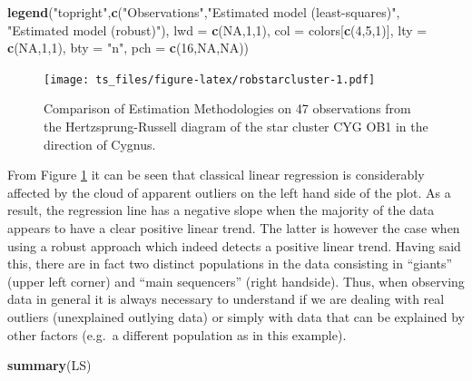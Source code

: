 \documentclass[]{book}
\newenvironment{Shaded}{\begin{snugshade}}{\end{snugshade}}
\newcommand{\DataTypeTok}[1]{\textcolor[rgb]{0.13,0.29,0.53}{#1}}
\newcommand{\DecValTok}[1]{\textcolor[rgb]{0.00,0.00,0.81}{#1}}
\newcommand{\KeywordTok}[1]{\textcolor[rgb]{0.13,0.29,0.53}{\textbf{#1}}}
\newcommand{\NormalTok}[1]{#1}
\newcommand{\OtherTok}[1]{\textcolor[rgb]{0.56,0.35,0.01}{#1}}
\newcommand{\StringTok}[1]{\textcolor[rgb]{0.31,0.60,0.02}{#1}}
\theoremstyle{definition}
\theoremstyle{definition}
\theoremstyle{definition}
\theoremstyle{remark}
\begin{document}
\begin{Shaded}
\begin{Highlighting}[]
\KeywordTok{legend}\NormalTok{(}\StringTok{"topright"}\NormalTok{,}\KeywordTok{c}\NormalTok{(}\StringTok{"Observations"}\NormalTok{,}\StringTok{"Estimated model (least-squares)"}\NormalTok{,}
                    \StringTok{"Estimated model (robust)"}\NormalTok{), }\DataTypeTok{lwd =} \KeywordTok{c}\NormalTok{(}\OtherTok{NA}\NormalTok{,}\DecValTok{1}\NormalTok{,}\DecValTok{1}\NormalTok{), }
       \DataTypeTok{col =}\NormalTok{ colors[}\KeywordTok{c}\NormalTok{(}\DecValTok{4}\NormalTok{,}\DecValTok{5}\NormalTok{,}\DecValTok{1}\NormalTok{)], }\DataTypeTok{lty =} \KeywordTok{c}\NormalTok{(}\OtherTok{NA}\NormalTok{,}\DecValTok{1}\NormalTok{,}\DecValTok{1}\NormalTok{), }
       \DataTypeTok{bty =} \StringTok{"n"}\NormalTok{, }\DataTypeTok{pch =} \KeywordTok{c}\NormalTok{(}\DecValTok{16}\NormalTok{,}\OtherTok{NA}\NormalTok{,}\OtherTok{NA}\NormalTok{))}
\end{Highlighting}
\end{Shaded}

\begin{figure}
\centering
\texttt{[image: ts\_files/figure-latex/robstarcluster-1.pdf]}
\caption{\label{fig:robstarcluster}Comparison of Estimation Methodologies on
47 observations from the Hertzsprung-Russell diagram of the star cluster
CYG OB1 in the direction of Cygnus.}
\end{figure}

From Figure \ref{fig:robstarcluster} it can be seen that classical
linear regression is considerably affected by the cloud of apparent
outliers on the left hand side of the plot. As a result, the regression
line has a negative slope when the majority of the data appears to have
a clear positive linear trend. The latter is however the case when using
a robust approach which indeed detects a positive linear trend. Having
said this, there are in fact two distinct populations in the data
consisting in ``giants'' (upper left corner) and ``main sequencers''
(right handside). Thus, when observing data in general it is always
necessary to understand if we are dealing with real outliers
(unexplained outlying data) or simply with data that can be explained by
other factors (e.g.~a different population as in this example).

\begin{Shaded}
\begin{Highlighting}[]
\KeywordTok{summary}\NormalTok{(LS)}
\end{Highlighting}
\end{Shaded}
\end{document}

